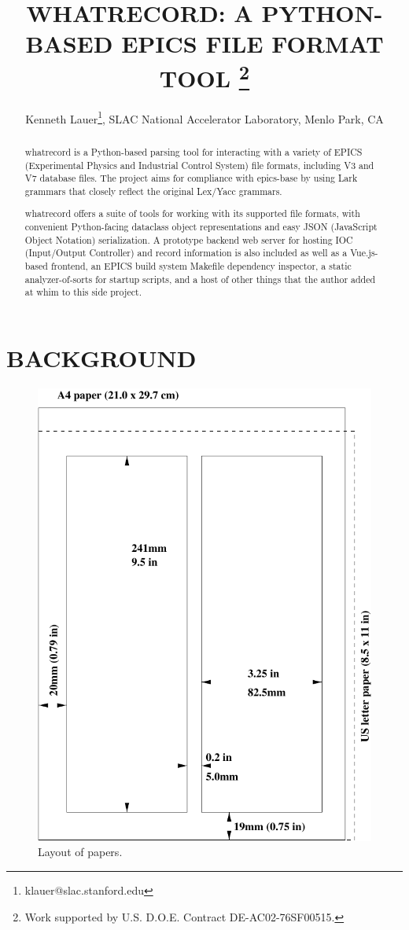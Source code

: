 \documentclass[letter,
               keeplastbox,   %
               ]{jacow}
\begin{document}
\title{WHATRECORD: A PYTHON-BASED EPICS FILE FORMAT TOOL
\thanks{Work supported by U.S. D.O.E. Contract DE-AC02-76SF00515.}}
\author{Kenneth Lauer\thanks{klauer@slac.stanford.edu}, SLAC National Accelerator Laboratory, Menlo Park, CA }
	
\maketitle

%
\begin{abstract}
  whatrecord is a Python-based parsing tool for interacting with a variety of
  EPICS (Experimental Physics and Industrial Control System) file formats,
  including V3 and V7 database files. The project aims for compliance with
  epics-base by using Lark\cite{lark} grammars that closely reflect the
  original Lex/Yacc grammars. 

  whatrecord offers a suite of tools for working with its supported file
  formats, with convenient Python-facing dataclass object representations and
  easy JSON (JavaScript Object Notation) serialization. A prototype backend web
  server for hosting IOC (Input/Output Controller) and record information is
  also included as well as a Vue.js-based frontend, an EPICS build system
  Makefile dependency inspector, a static analyzer-of-sorts for startup
  scripts, and a host of other things that the author added at whim to this
  side project.
\end{abstract}


\section{BACKGROUND}

\begin{figure}[!htb]
   \centering
   \includegraphics*[width=.7\columnwidth]{JACpic_mc}
   \caption{Layout of papers.}
   \label{fig:paper_layout}
\end{figure}
\end{document}
